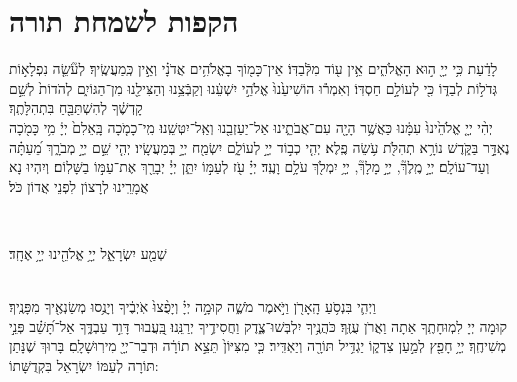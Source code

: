 \documentclass[twoside, openany, parskip=half, 11pt]{book}
\begin{document}
\chapter[הקפות לשמחת תורה]{ הקפות לשמחת תורה }


 לָדַ֔עַת כִּ֥י יְיָ֖ ה֣וּא הָאֱלֹהִ֑ים אֵ֥ין ע֖וֹד מִלְּֿבַדּֽוֹ׃ \hfill \break
אֵין־כָּמ֖וֹךָ בָאֱלֹהִ֥ים אֲדֹנָ֗י וְאֵ֣ין כְּֽמַעֲשֶֽׂיךָ׃ \hfill \break
לְעֹ֘שֵׂ֤ה נִפְלָא֣וֹת גְּדֹל֣וֹת לְבַדּ֑וֹ כִּ֖י לְעוֹלָ֣ם חַסְדּֽוֹ׃ \hfill \break
וְאִמְר֕וּ הוֹשִׁיעֵ֙נוּ֙ אֱלֹהֵ֣י יִשְׁעֵ֔נוּ וְקַבְּֿצֵ֥נוּ וְהַצִּילֵ֖נוּ מִן־הַגּוֹיִ֑ם לְהֹדוֹת֙ לְשֵׁ֣ם קָדְשֶׁ֔ךָ לְהִשְׁתַּבֵּ֖חַ בִּתְהִלָּתֶֽךָ׃\\
יְהִ֨י יְיָ֤ אֱלֹהֵ֙ינוּ֙ עִמָּ֔נוּ כַּאֲשֶׁ֥ר הָיָ֖ה עִם־אֲבֹתֵ֑ינוּ אַל־יַעַזְבֵ֖נוּ וְאַֽל־יִטְּשֵֽׁנוּ׃ \hfill \break
מִֽי־כָמֹ֤כָה בָּֽאֵלִם֙ יְיָ֔ מִ֥י כָּמֹ֖כָה נֶאְדָּ֣ר בַּקֹּ֑דֶשׁ נוֹרָ֥א תְהִלֹּ֖ת עֹ֥שֵׂה פֶֽלֶא׃ \hfill \break
יְהִ֤י כְב֣וֹד יְיָ֣ לְעוֹלָ֑ם יִשְׂמַ֖ח יְיָ֣ בְּמַעֲשָֽׂיו׃ \hfill \break
יְהִ֤י שֵׁ֣ם יְיָ֣ מְבֹרָ֑ךְ מֵ֝עַתָּ֗ה וְעַד־עוֹלָֽם׃ \hfill \break
יְיָ֣ מֶֽלֶךְ֘, יְיָ֣ מָלָךְ֘, יְיָ֥ יִמְלֹ֖ךְ עֹלָ֥ם וָעֶֽד׃ \hfill \break
יְיָ֗ עֹ֖ז לְעַמּ֣וֹ יִתֵּ֑ן יְיָ֓ יְבָרֵ֖ךְ אֶת־עַמּ֣וֹ בַשָּׁלֽוֹם׃ \hfill \break
וְיִהְיוּ נָא אֲמָרֵֽינוּ לְרָצוֹן לִפְנֵי אֲדוֹן כֹּל׃ \hfill \break

\vspace{-1.3\baselineskip}

\\
\begin{large}
שְׁמַ֖ע יִשְׂרָאֵ֑ל יְיָ֥ אֱלֹהֵ֖ינוּ יְיָ֥ אֶחָֽד׃
\end{large}

\\
וַיְהִ֛י בִּנְסֹ֥עַ הָֽאָרֹ֖ן וַיֹּ֣אמֶר מֹשֶׁ֑ה קוּמָ֣ה יְיָ֗ וְיָפֻ֨צוּ֙ אֹֽיְבֶ֔יךָ וְיָנֻ֥סוּ מְשַׂנְאֶ֖יךָ מִפָּנֶֽיךָ׃\\
קוּמָה יְיָ לִמְוּחָתֶֽךָ אַתָה וַאֲרֹן עֻזֶּֽךָ׃ \hfill \break
כֹּהֲנֶ֥יךָ יִלְבְּשׁוּ־צֶ֑דֶק וַחֲסִידֶ֥יךָ יְרַנֵּֽנוּ׃ \hfill \break
 בַּֽ֭עֲבוּר דָּוִ֣ד עַבְדֶּ֑ךָ אַל־תָּ֝שֵׁ֗ב פְּנֵ֣י מְשִׁיחֶֽךָ׃ \hfill \break
יְיָ֥ חָפֵ֖ץ לְמַ֣עַן צִדְק֑וֹ יַגְדִּ֥יל תּוֹרָ֖ה וְיַאְדִּֽיר׃ \hfill \break
כִּ֤י מִצִּיּוֹן֙ תֵּצֵ֣א תוֹרָ֔ה וּדְבַר־יְיָ֖ מִירֽוּשָׁלָֽםִ׃ \hfill \break
  בָּרוּךְ שֶׁנָּתַן תּוֹרָה לְעַמּוֹ יִשְׂרָאֵל בִּקְדֻשָּׁתוֹ: \hfill \break
\end{document}
